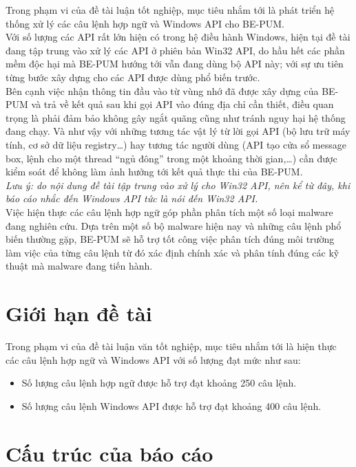Trong phạm vi của đề tài luận tốt nghiệp, mục tiêu nhắm tới là phát triển hệ thống xử lý các câu lệnh hợp ngữ và Windows API cho BE-PUM.\\

Với số lượng các API rất lớn hiện có trong hệ điều hành Windows, hiện tại đề tài đang tập trung vào xử lý các API ở phiên bản Win32 API, do hầu hết các phần mềm độc hại mà BE-PUM hướng tới vẫn đang dùng bộ API này; với sự ưu tiên từng bước xây dựng cho các API được dùng phổ biến trước.\\

Bên cạnh việc nhận thông tin đầu vào từ vùng nhớ đã được xây dựng của BE-PUM và trả về kết quả sau khi gọi API vào đúng địa chỉ cần thiết, điều quan trọng là phải đảm bảo không gây ngắt quãng cũng như tránh nguy hại hệ thống đang chạy. Và như vậy với những tương tác vật lý từ lời gọi API (bộ lưu trữ máy tính, cơ sở dữ liệu registry…) hay tương tác người dùng (API tạo cửa sổ message box, lệnh cho một thread “ngủ đông” trong một khoảng thời gian,…) cần được kiểm soát để không làm ảnh hưởng tới kết quả thực thi của BE-PUM.\\

\textit{Lưu ý: do nội dung đề tài tập trung vào xử lý cho Win32 API, nên kể từ đây, khi báo cáo nhắc đến Windows API tức là nói đến Win32 API.}\\

Việc hiện thực các câu lệnh hợp ngữ góp phần phân tích một số loại malware đang nghiên cứu. Dựa trên một số bộ malware hiện nay và những câu lệnh phổ biến thường gặp, BE-PUM sẽ hỗ trợ tốt công việc phân tích đúng môi trường làm việc của từng câu lệnh từ đó xác định chính xác và phân tính đúng các kỹ thuật mà malware đang tiến hành.

\newpage
\section{Giới hạn đề tài}

Trong phạm vi của đề tài luận văn tốt nghiệp, mục tiêu nhắm tới là hiện thực các câu lệnh hợp ngữ và Windows API với số lượng đạt mức như sau:

\begin{itemize}
  \item Số lượng câu lệnh hợp ngữ được hỗ trợ đạt khoảng 250 câu lệnh.
  \item Số lượng câu lệnh Windows API được hỗ trợ đạt khoảng 400 câu lệnh.
\end{itemize}

\section{Cấu trúc của báo cáo}

